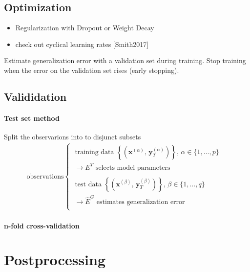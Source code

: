 \documentclass{article}
\begin{document}
\subsection{Optimization}

\begin{itemize}
\item Regularization with Dropout or Weight Decay
\item check out cyclical learning rates \cite{Smith2017}[Smith2017]
\end{itemize}


Estimate generalization error with a validation set during training. Stop training when the error on the validation set rises (early stopping).

\subsection{Valididation}

\paragraph{Test set method} Split the observarions into to disjunct subsets 
\begin{align*}
\text{observations}
\begin{cases}
	\text{ training data } \left\{ \left(\mathbf x^{(\alpha)}, \,\mathbf y_T^{(\alpha)}\right) \right \}, \, \alpha \in \{1,\dots, p\} & \\	
	\;\rightarrow E^T \text{ selects model parameters} & \\	 \\
	\text{ test data } \left\{ \left(\mathbf x^{(\beta)}, \,\mathbf y_T^{(\beta)}\right) \right \}, \, \beta \in \{1,\dots, q\} & \\	
	\;\rightarrow \widehat{E}^G \text{ estimates generalization error} & \\	
\end{cases}
\end{align*} 

\paragraph{n-fold cross-validation} 



\section{Postprocessing}
\end{document}
